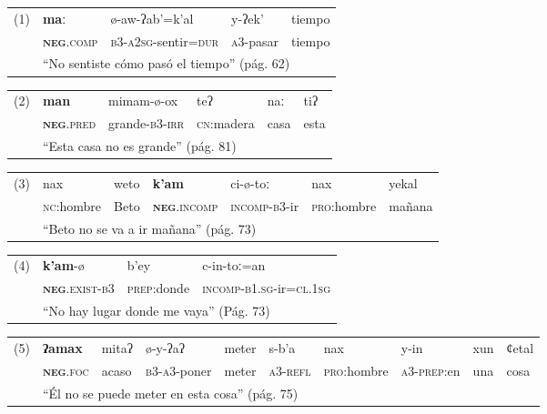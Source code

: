 {\noindent \setmainfont{Charis SIL}
\begin{tabular}{lllll}
(1) & \textbf{maː} & ø-aw-ʔab'=k'al & y-ʔek' & tiempo \\
& \textsc{\textbf{neg}.comp} & \textsc{b3-a2sg}-sentir\textsc{=dur} & \textsc{a3}-pasar & tiempo \\
& \multicolumn{4}{l}{“No sentiste cómo pasó el tiempo” (pág. 62)}
\end{tabular} \vspace{0.20cm}

\noindent \begin{tabular}{llllll}
(2) & \textbf{man} & mimam-ø-ox & teʔ & naː & tiʔ \\
 & \textsc{\textbf{neg}.pred} & grande-\textsc{b3-irr} & \textsc{cn}:madera & casa & esta \\
 & \multicolumn{5}{l}{“Esta casa no es grande” (pág. 81)}
\end{tabular} \vspace{0.20cm}

\noindent \begin{tabular}{lllllll}
(3) & nax & weto & \textbf{k'am} & ci-ø-toː & nax & yekal \\
& \textsc{nc}:hombre & Beto & \textsc{\textbf{neg}.incomp} & \textsc{incomp-b3}-ir & \textsc{pro}:hombre & mañana \\
& \multicolumn{6}{l}{“Beto no se va a ir mañana” (pág. 73)}                         
\end{tabular} \vspace{0.20cm}

\noindent \begin{tabular}{llll}
(4) & \textbf{k'am}-ø & b'ey & c-in-toː=an \\
& \textsc{\textbf{neg}.exist-b3} & \textsc{prep}:donde & \textsc{incomp-b1.sg}-ir=\textsc{cl.1sg} \\
& \multicolumn{3}{l}{“No hay lugar donde me vaya” (Pág. 73)}  
\end{tabular} \vspace{0.20cm}

{\footnotesize
\noindent \begin{tabular}{llllllllll}
(5) & \textbf{ʔamax} & mitaʔ & ø-y-ʔaʔ & meter & s-b'a & nax & y-in & xun & ȼetal \\
& \textsc{\textbf{neg}.foc}  & acaso & \textsc{b3-a3}-poner & meter & \textsc{a3-refl} & \textsc{pro}:hombre & \textsc{a3-prep}:en & una & cosa \\
& \multicolumn{9}{l}{“Él no se puede meter en esta cosa” (pág. 75)}                                                         
\end{tabular} \vspace{0.20cm}
}

}
